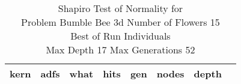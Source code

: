 \begin{table}[H]
\caption{Shapiro Test of Normality for \\ Problem  Bumble Bee 3d  Number of Flowers 15\\Best of Run Individuals \\ Max Depth 17 Max Generations 52\\}
\begin{center}
\scalebox{0.8} %
{
\begin{tabular}{lrrrrrrr}
\hline
kern & adfs & what & hits & gen & nodes & depth \\
\hline


\end{tabular}
}
\end{center}
\end{table}

